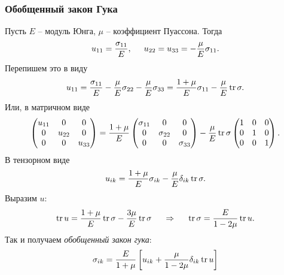 \subsubsection*{Обобщенный закон Гука}

Пусть $E$ -- модуль Юнга, $\mu$ -- коэффициент Пуассона. Тогда
$$
    u_{11} = \frac{\sigma_{11}}{E}, \hspace{0.5cm} 
    u_{22} = u_{33} = - \frac{\mu}{E} \sigma_{11}.
$$
Перепишем это в виду
$$
    u_{11} = \frac{\sigma_{11}}{E}  - \frac{\mu}{E} \sigma_{22} -
    \frac{\mu}{E} \sigma_{33} = \frac{1+\mu}{E} \sigma_{11} - \frac{\mu}{E} \mathop{\mathrm{tr}}\nolimits \sigma.
$$
Или, в матричном виде
$$
    \begin{pmatrix}
        u_{11} & 0 & 0\\
        0 & u_{22} & 0 \\
        0 & 0 & u_{33}
    \end{pmatrix} =
    \frac{1+\mu}{E} 
    \begin{pmatrix}
        \sigma_{11} & 0 & 0\\
        0 & \sigma_{22} & 0 \\
        0 & 0 & \sigma_{33}
    \end{pmatrix} -
    \frac{\mu}{E} \mathop{\mathrm{tr}}\nolimits \sigma 
    \begin{pmatrix}
        1 & 0 & 0\\
        0 & 1 & 0 \\
        0 & 0 & 1
    \end{pmatrix}.
$$
В тензорном виде
$$
    u_{ik} = \frac{1+\mu}{E} \sigma_{ik} - \frac{\mu}{E} \delta_{ik} \mathop{\mathrm{tr}}\nolimits \sigma .
$$
Выразим $u$:
$$
    \mathop{\mathrm{tr}}\nolimits u = \frac{1+\mu}{E} \mathop{\mathrm{tr}}\nolimits \sigma - \frac{3\mu}{E} \mathop{\mathrm{tr}}\nolimits \sigma
    \hspace{0.5cm} \Rightarrow \hspace{0.5cm} 
    \mathop{\mathrm{tr}}\nolimits \sigma = \frac{E}{1-2\mu} \mathop{\mathrm{tr}}\nolimits u.
$$
Так и получаем \textit{обобщенный закон гука}:
\begin{equation*}
    \sigma_{ik} = \frac{E}{1+\mu} \left[
        u_{ik} + \frac{\mu}{1 - 2\mu} \delta_{ik} \mathop{\mathrm{tr}}\nolimits u 
    \right]
\end{equation*}